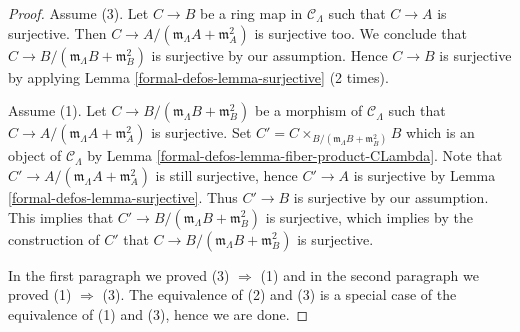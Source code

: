 \begin{proof}
Assume (3). Let $C \to B$ be a ring map in $\mathcal{C}_\Lambda$ such
that $C \to A$ is surjective. Then
$C \to A/(\mathfrak m_\Lambda A + \mathfrak m_A^2)$ is surjective
too. We conclude that $C \to B/(\mathfrak m_\Lambda B + \mathfrak m_B^2)$
is surjective by our assumption. Hence $C \to B$ is surjective by applying
Lemma \ref{formal-defos-lemma-surjective} (2 times).

\medskip\noindent
Assume (1). Let $C \to B/(\mathfrak m_\Lambda B + \mathfrak m_B^2)$
be a morphism of $\mathcal{C}_\Lambda$ such that
$C \to A/(\mathfrak m_\Lambda A + \mathfrak m_A^2)$ is surjective. Set
$C' = C \times_{B/(\mathfrak m_\Lambda B + \mathfrak m_B^2)} B$
which is an object of $\mathcal{C}_\Lambda$ by
Lemma \ref{formal-defos-lemma-fiber-product-CLambda}.
Note that $C' \to A/(\mathfrak m_\Lambda A + \mathfrak m_A^2)$
is still surjective, hence $C' \to A$ is surjective by
Lemma \ref{formal-defos-lemma-surjective}.
Thus $C' \to B$ is surjective by our assumption. This implies
that $C' \to B/(\mathfrak m_\Lambda B + \mathfrak m_B^2)$ is
surjective, which implies by the construction of $C'$ that
$C \to B/(\mathfrak m_\Lambda B + \mathfrak m_B^2)$ is surjective.

\medskip\noindent
In the first paragraph we proved (3) $\Rightarrow$ (1) and in the second
paragraph we proved (1) $\Rightarrow$ (3). The equivalence of
(2) and (3) is a special case of the equivalence of (1) and (3), hence
we are done.
\end{proof}

